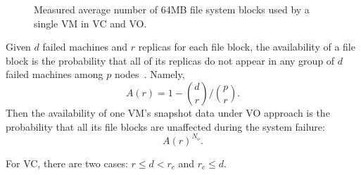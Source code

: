 \begin{figure}[htbp]
  \centering
  \caption{Measured average number of 64MB file system blocks used by a single VM in
VC and VO. }
  \label{fig:vm-links}
\end{figure}

Given $d$ failed machines and $r$ replicas for each file block,
the availability of a file block is the probability that  
all of its replicas do not appear in any group of $d$ failed machines among $p$ nodes~\cite{CoHadoop2011}. 
Namely, 
\[
A(r) = 1-\binom{d}{r}/ \binom{p}{r}. 
\]
Then the availability of one VM's snapshot data under VO approach is the probability that
 all its file blocks  are unaffected during the system failure:
\[
A(r)^{N_o}. 
\]

For VC, there are two cases: $r \le d<r_c$ and $r_c \leq d$.  

